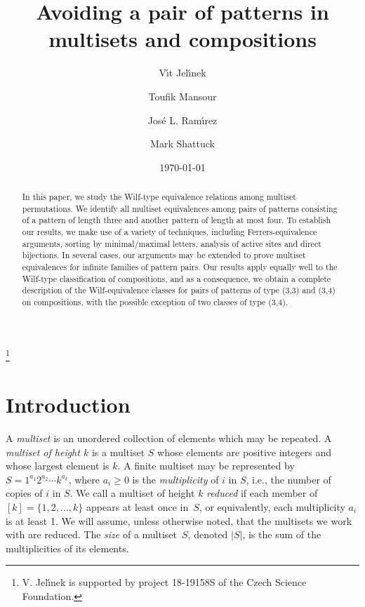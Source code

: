 \documentclass[11pt]{amsart}
\theoremstyle{plain}
\theoremstyle{definition}
\begin{document}
\title[Avoiding in multisets]{Avoiding a pair of patterns in multisets and compositions}
\author[V. Jel\'\i nek]{V\'\i t Jel\'\i nek}
\address{Computer Science Institute, Charles University, Prague, Czechia}
\author[T. Mansour]{Toufik Mansour}
\address{Department of Mathematics, University of Haifa,
3498838 Haifa, Israel}
\author[J. L. Ram\'{\i}rez]{Jos\'e L. Ram\'{\i}rez}
\address{Departamento de Matem\'aticas,  Universidad Nacional de Colombia,  Bogot\'a, Colombia}
\author[M. Shattuck]{Mark Shattuck}
\address{Department of Mathematics, University of Tennessee,
37996 Knoxville, TN, USA}
\thanks{V. Jel{\'\i}nek is supported by project 18-19158S of
the Czech Science
Foundation.}

\begin{abstract}
In this paper, we study the Wilf-type equivalence relations among multiset permutations. We identify
all multiset equivalences among pairs of patterns consisting of a
pattern of length three and another pattern of length at most four.  To establish our results, we
make use of a variety of techniques, including Ferrers-equivalence arguments, sorting by
minimal/maximal letters, analysis of active sites and direct bijections.  In several cases, our
arguments may be extended to prove multiset equivalences for infinite families of pattern pairs.
Our results apply equally well to the Wilf-type classification of compositions, and as a consequence, we
obtain a complete description of the Wilf-equivalence classes for pairs of patterns of type (3,3)
and (3,4) on compositions, with the possible exception of two classes of type (3,4).

\end{abstract}

\date{\today}

\maketitle

\section{Introduction}

A \emph{multiset} is an unordered collection of elements which may be repeated. A \emph{multiset of
height $k$} is a multiset $S$ whose elements are positive integers and whose largest element is $k$. A finite
multiset may be represented by $S=1^{a_1}2^{a_2}\cdots k^{a_k}$, where $a_i\geq 0$ is the
\emph{multiplicity} of $i$ in $S$, i.e., the number of copies of $i$ in $S$. We call a multiset of
height $k$ \emph{reduced} if each member of $[k]=\{1,2,\ldots,k\}$ appears at least once in~$S$, or
equivalently, each multiplicity $a_i$ is at least 1. We will assume, unless otherwise noted, that the
multisets we work with are reduced. The \emph{size} of a multiset~$S$, denoted $|S|$, is the sum of
the multiplicities of its elements.
\end{document}
